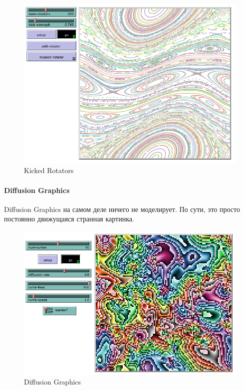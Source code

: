 \documentclass[14pt,a4paper,report]{report}
\begin{document}
\begin{figure}[h!]
	\centering
	\includegraphics[scale = 0.49]{images/8.png}
	\caption{Kicked Rotators}
\end{figure}
\clearpage

\paragraph{Diffusion Graphics}

Diffusion Graphics на самом деле ничего не моделирует. По сути, это просто постоянно движущаяся странная картинка.

\begin{figure}[h!]
	\centering
	\includegraphics[scale = 0.49]{images/9.png}
	\caption{Diffusion Graphics}
\end{figure}
\end{document}

